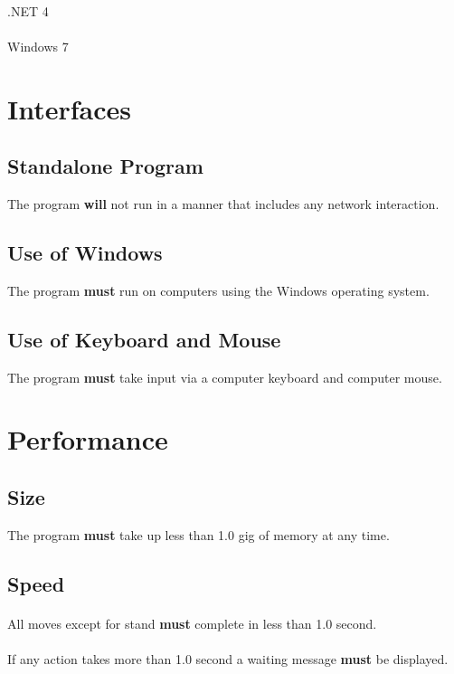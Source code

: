 \documentclass{article}
\begin{document}
\paragraph{} .NET 4
\paragraph{} Windows 7


\section{Interfaces}


\subsection{Standalone Program}The program \textbf{will} not run in a manner that includes any network interaction.


\subsection{Use of Windows}The program \textbf{must} run on computers using the Windows operating system.


\subsection{Use of Keyboard and Mouse}The program \textbf{must} take input via a computer keyboard and computer mouse.

\section{ Performance}

\subsection{Size}The program \textbf{must} take up less than 1.0 gig of memory at any time.
\subsection{Speed}
\paragraph{}All moves except for stand \textbf{must} complete in less than 1.0 second.
\paragraph{}If any action takes more than 1.0 second a waiting message \textbf{must} be displayed.
\end{document}

